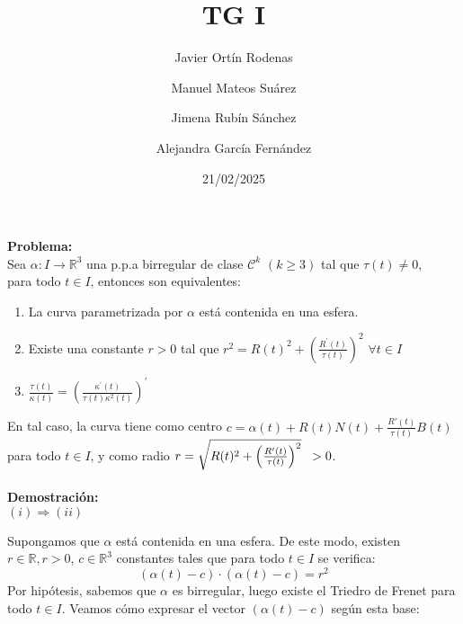 \documentclass{article}
\begin{document}
\title{TG I}
\date{21/02/2025}
\maketitle
\begin{center}
    
    \author{
    Javier Ortín Rodenas \\
    \and Manuel Mateos Suárez \\
    \and Jimena Rubín Sánchez \\
    \and Alejandra García Fernández
    }   
\end{center}
\vspace{5mm}
\noindent
\textbf{Problema:} \\[1mm]

Sea $\alpha : I \to \mathbb{R} ^3$ una p.p.a birregular de clase
$\mathcal{C}^k$ $(k \geq 3)$ tal que $\tau(t) \neq 0$, \\
para todo $t \in I$, entonces son equivalentes:

\begin{enumerate}[label=(\roman*)]
    \item La curva parametrizada por $\alpha$ está contenida en una esfera.
    \item Existe una constante $r > 0$ tal que $r^2 = R(t)^2 + \left(\frac{R^\prime(t)}{\tau(t)}\right)^2$ \hspace{2mm} $\forall t \in I$
    \item $\frac{\tau(t)}{\kappa(t)} = \left( \frac{\kappa^\prime(t)}{\tau(t) \kappa^2(t)} \right)^\prime$
\end{enumerate}
\noindent
En tal caso, la curva tiene como centro
$c = \alpha(t) + R(t)N(t) + \frac{R'(t)}{\tau(t)}B(t)$
para todo $t \in I$, y como radio
$r = \sqrt{R(t)^2 + \left( \frac{R'(t)}{\tau(t)}\right)^2} \hspace{2mm} > 0$.
\\\\[0,6cm]
\textbf{Demostración:} \\[0,2cm]
\underline{$(i) \Rightarrow (ii)$} \vspace{2mm}

Supongamos que $\alpha$ está contenida en una esfera.
De este modo, existen $r \in \mathbb{R}, r > 0$, $c \in \mathbb{R}^3$
constantes tales que para todo $t \in I$ se verifica:
$$(\alpha(t) - c) \cdot (\alpha(t) - c) = r^2$$
Por hipótesis, sabemos que $\alpha$ es birregular,
luego existe el Triedro de Frenet para todo $t \in I$.
Veamos cómo expresar el vector $(\alpha(t) - c)$ según esta base:
\end{document}
